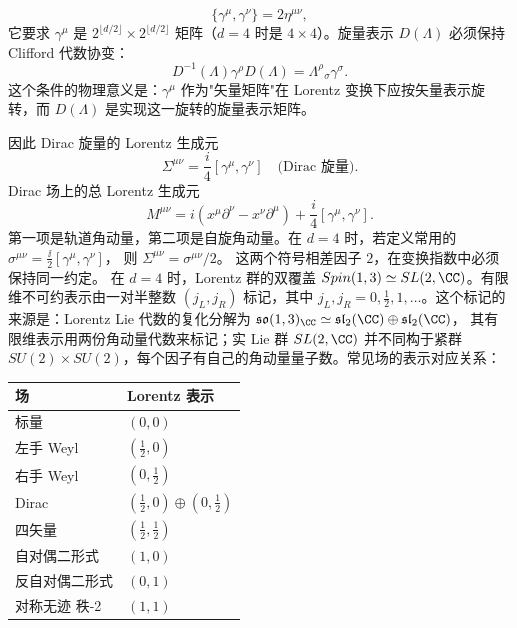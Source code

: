 \begin{equation*}{\{\gamma^\mu,\gamma^\nu\}=2\eta^{\mu\nu},}
\end{equation*}
它要求 $\gamma^\mu$ 是 $2^{\lfloor d/2\rfloor}\times 2^{\lfloor d/2\rfloor}$ 矩阵（$d=4$ 时是 $4\times4$）。旋量表示 $D(\Lambda)$ 必须保持 Clifford 代数协变：
\begin{equation}\label{eq:ms-poincare-clifford-cov}
D^{-1}(\Lambda)\gamma^\rho D(\Lambda)=\Lambda^\rho{}_\sigma\gamma^\sigma.
\end{equation}
这个条件的物理意义是：$\gamma^\mu$ 作为"矢量矩阵"在 Lorentz 变换下应按矢量表示旋转，而 $D(\Lambda)$ 是实现这一旋转的旋量表示矩阵。

因此 Dirac 旋量的 Lorentz 生成元
\begin{equation}\label{eq:ms-poincare-Sigma-dirac}
{\Sigma^{\mu\nu}=\frac{i}{4}[\gamma^\mu,\gamma^\nu]\quad\text{(Dirac 旋量)}.}
\end{equation}
Dirac 场上的总 Lorentz 生成元
\begin{equation*}{
M^{\mu\nu}=i(x^\mu\partial^\nu-x^\nu\partial^\mu)+\frac{i}{4}[\gamma^\mu,\gamma^\nu].
}
\end{equation*}
第一项是轨道角动量，第二项是自旋角动量。在 $d=4$ 时，若定义常用的
$\sigma^{\mu\nu}=\frac{\ii}{2}[\gamma^\mu,\gamma^\nu]$，
则 $\Sigma^{\mu\nu}=\sigma^{\mu\nu}/2$。
这两个符号相差因子 $2$，在变换指数中必须保持同一约定。
在 $d=4$ 时，Lorentz 群的双覆盖 $Spin(1,3)\simeq SL(2,\CC)$。有限维不可约表示由一对半整数 $(j_L,j_R)$ 标记，其中 $j_L,j_R=0,\frac{1}{2},1,\ldots$。这个标记的来源是：Lorentz Lie 代数的复化分解为
$\mathfrak{so}(1,3)_\CC\simeq\mathfrak{sl}_2(\CC)\oplus\mathfrak{sl}_2(\CC)$，
其有限维表示用两份角动量代数来标记；实 Lie 群 $SL(2,\CC)$
并不同构于紧群 $SU(2)\times SU(2)$，每个因子有自己的角动量量子数。常见场的表示对应关系：

\begin{center}
\begin{tabular}{ll}
\hline
场 & Lorentz 表示 \\
\hline
标量 & $(0,0)$ \\
左手 Weyl & $(\frac{1}{2},0)$ \\
右手 Weyl & $(0,\frac{1}{2})$ \\
Dirac & $(\frac{1}{2},0)\oplus(0,\frac{1}{2})$ \\
四矢量 & $(\frac{1}{2},\frac{1}{2})$ \\
自对偶二形式 & $(1,0)$ \\
反自对偶二形式 & $(0,1)$ \\
对称无迹 秩-2 & $(1,1)$ \\
\hline
\end{tabular}
\end{center}

